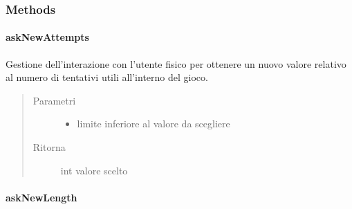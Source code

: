 \documentclass[letterpaper,10pt,italian,openany,oneside]{sphinxmanual}
\begin{document}
\subsubsection{Methods}
\label{\detokenize{test/it/unicam/cs/pa/mastermind/ui/StartView:methods}}

\paragraph{askNewAttempts}
\label{\detokenize{test/it/unicam/cs/pa/mastermind/ui/StartView:asknewattempts}}

\begin{fulllineitems}
\label{\detokenize{test/it/unicam/cs/pa/mastermind/ui/StartView:it.unicam.cs.pa.mastermind.ui.StartView.askNewAttempts(int)}}
Gestione dell’interazione con l’utente fisico per ottenere un nuovo valore relativo al numero di tentativi utili all’interno del gioco.
\begin{quote}\begin{description}
\item[{Parametri}] \leavevmode\begin{itemize}
\item {} 
 \textendash{} limite inferiore al valore da scegliere

\end{itemize}

\item[{Ritorna}] \leavevmode
int valore scelto

\end{description}\end{quote}

\end{fulllineitems}



\paragraph{askNewLength}
\label{\detokenize{test/it/unicam/cs/pa/mastermind/ui/StartView:asknewlength}}
\end{document}
